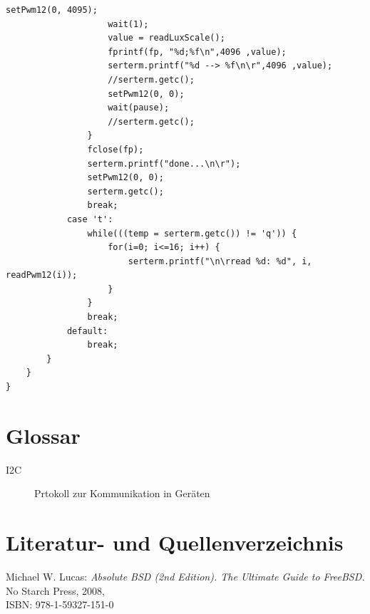 \documentclass[a4paper,12pt]{scrartcl}
\begin{document}
\begin{lstlisting}[captionpos=b, caption=MBED-Programmcode für den Messaufbau, label=messprogkomplett]
                    setPwm12(0, 4095);
                    wait(1);
                    value = readLuxScale();
                    fprintf(fp, "%d;%f\n",4096 ,value);
                    serterm.printf("%d --> %f\n\r",4096 ,value);
                    //serterm.getc();
                    setPwm12(0, 0);
                    wait(pause);
                    //serterm.getc();
                }
                fclose(fp);
                serterm.printf("done...\n\r");
                setPwm12(0, 0);
                serterm.getc();
                break;
            case 't':
                while(((temp = serterm.getc()) != 'q')) {
                    for(i=0; i<=16; i++) {
                        serterm.printf("\n\rread %d: %d", i, readPwm12(i));
                    }
                }
                break;
            default:
                break;
        }
    }
}
\end{lstlisting}


\clearpage
\section{Glossar}
\begin{description}
 \item[I2C] Prtokoll zur Kommunikation in Ger\"aten
\end{description}

\clearpage
\section{Literatur- und Quellenverzeichnis}

\renewcommand\refname{Literaturverzeichnis}
\begin{thebibliography}{999}

Michael W. Lucas:  {\sl Absolute BSD (2nd Edition). The Ultimate Guide to FreeBSD.} No Starch Press, 2008,
\\ISBN: 978-1-59327-151-0

\end{thebibliography}
\end{document}
